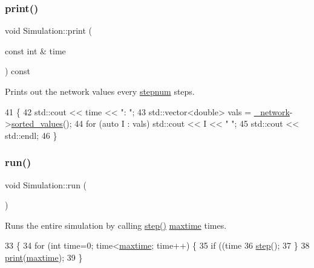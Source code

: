 \subsubsection{\texorpdfstring{print()}{print()}}
{\footnotesize\ttfamily void Simulation\+::print (\begin{DoxyParamCaption}\item[{const int \&}]{time }\end{DoxyParamCaption}) const\hspace{0.3cm}{\ttfamily [private]}}

Prints out the network values every \mbox{\hyperlink{classSimulation_a6bfba2071d6358af042ca417637c6c36}{stepnum}} steps. 
\begin{DoxyCode}
41                                             \{
42     std::cout << time << \textcolor{stringliteral}{": "};
43     std::vector<double> vals = \mbox{\hyperlink{classSimulation_a5f1d8152b13bc4640c8a3fddcfe7eae9}{\_network}}->\mbox{\hyperlink{classNetwork_a9f79d1f7ffd359d879f647da3eaf95b3}{sorted\_values}}();
44     \textcolor{keywordflow}{for} (\textcolor{keyword}{auto} I : vals) std::cout << I << \textcolor{stringliteral}{" "};
45     std::cout << std::endl;
46 \}
\end{DoxyCode}
\mbox{\label{classSimulation_ae5c367f87c0b5dc9740bc6d00e44e72c}} 
\subsubsection{\texorpdfstring{run()}{run()}}
{\footnotesize\ttfamily void Simulation\+::run (\begin{DoxyParamCaption}{ }\end{DoxyParamCaption})}

Runs the entire simulation by calling \mbox{\hyperlink{classSimulation_a49899e122ecc9f0eaba8d40182030d24}{step()}} \mbox{\hyperlink{classSimulation_a2db45338d73f8e7823eb85015532be23}{maxtime}} times. 
\begin{DoxyCode}
33                      \{
34     \textcolor{keywordflow}{for} (\textcolor{keywordtype}{int} time=0; time<\mbox{\hyperlink{classSimulation_a2db45338d73f8e7823eb85015532be23}{maxtime}}; time++) \{
35         \textcolor{keywordflow}{if} ((time %
36         \mbox{\hyperlink{classSimulation_a49899e122ecc9f0eaba8d40182030d24}{step}}();
37     \}
38     \mbox{\hyperlink{classSimulation_a261acbceff8d384ea12cb010798504b2}{print}}(\mbox{\hyperlink{classSimulation_a2db45338d73f8e7823eb85015532be23}{maxtime}});
39 \}
\end{DoxyCode}
\mbox{\label{classSimulation_a49899e122ecc9f0eaba8d40182030d24}} 
